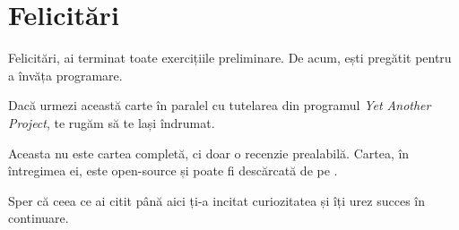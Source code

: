 \section{Felicitări}

Felicitări, ai terminat toate exercițiile preliminare. De acum, ești pregătit
pentru a învăța programare.

Dacă urmezi această carte în paralel cu tutelarea din programul \textit{Yet
Another Project}, te rugăm să te lași îndrumat.

Aceasta nu este cartea completă, ci doar o recenzie prealabilă. Cartea, în
întregimea ei, este open-source și poate fi descărcată de pe \phpro.

Sper că ceea ce ai citit până aici ți-a incitat curiozitatea și îți urez
succes în continuare.
